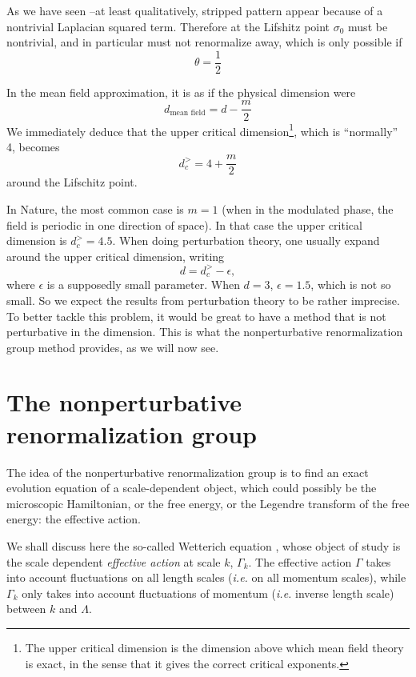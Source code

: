 As we have seen --at least qualitatively, stripped pattern appear because of a nontrivial Laplacian squared term. Therefore at the Lifshitz point $\sigma_0$ must be nontrivial, and in particular must not renormalize away, which is only possible if
\begin{equation}
\theta = \frac{1}{2}
\end{equation}

In the mean field approximation, it is as if the physical dimension were
\begin{equation}
d_{\text{mean field}} = d - \frac{m}{2}
\end{equation}
We immediately deduce that the upper critical dimension\footnote{The upper critical dimension is the dimension above which mean field theory is exact, in the sense that it gives the correct critical exponents.}, which is ``normally'' 4, becomes
\begin{equation}
d_c^> = 4 + \frac{m}{2}
\end{equation}
around the Lifschitz point.

In Nature, the most common case is $m=1$ (when in the modulated phase, the field is periodic in one direction of space). In that case the upper critical dimension is $d_c^> = 4.5$. When doing perturbation theory, one usually expand around the upper critical dimension, writing
\begin{equation}
d = d_c^> - \epsilon,
\end{equation} 
where $\epsilon$ is a supposedly small parameter. When $d=3$, $\epsilon = 1.5$, which is not so small. So we expect the results from perturbation theory to be rather imprecise. To better tackle this problem, it would be great to have a method that is not perturbative in the dimension. This is what the nonperturbative renormalization group method provides, as we will now see.

\section{The nonperturbative renormalization group}

The idea of the nonperturbative renormalization group is to find an exact evolution equation of a scale-dependent object, which could possibly be the microscopic Hamiltonian, or the free energy, or the Legendre transform of the free energy: the effective action. 

We shall discuss here the so-called Wetterich equation \cite{Wetterich}, whose object of study is the scale dependent \textit{effective action} at scale $k$,  $\Gamma_k$. The effective action $\Gamma$ takes into account fluctuations on all length scales (\textit{i.e.} on all momentum scales), while $\Gamma_k$ only takes into account fluctuations of momentum (\textit{i.e.} inverse length scale) between $k$ and $\Lambda$.

